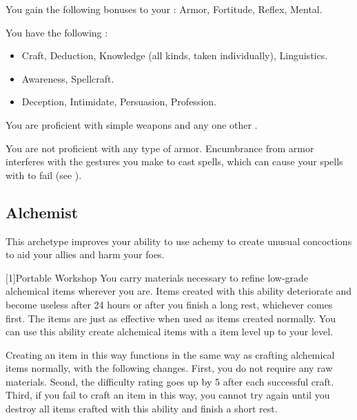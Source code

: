         You gain the following bonuses to your :  Armor,  Fortitude,  Reflex,  Mental.

        You have the following :
        \begin{itemize}
            \item {} Craft, Deduction, Knowledge (all kinds, taken individually), Linguistics.
            \item {} Awareness, Spellcraft.
            \item {} Deception, Intimidate, Persuasion, Profession.
        \end{itemize}

        You are proficient with simple weapons and any one other .

        You are not proficient with any type of armor.
        Encumbrance from armor interferes with the gestures you make to cast spells, which can cause your spells with  to fail (see ).

    \subsection{Alchemist}
        This archetype improves your ability to use achemy to create unusual concoctions to aid your allies and harm your foes.

        [1]{Portable Workshop} 
        You carry materials necessary to refine low-grade alchemical items wherever you are.
        Items created with this ability deteriorate and become useless after 24 hours or after you finish a long rest, whichever comes first.
        The items are just as effective when used as items created normally.
        You can use this ability create alchemical items with a item level up to your level.

        Creating an item in this way functions in the same way as crafting alchemical items normally, with the following changes.
        First, you do not require any raw materials.
        Seond, the difficulty rating goes up by 5 after each successful craft.
        Third, if you fail to craft an item in this way, you cannot try again until you destroy all items crafted with this ability and finish a short rest.

